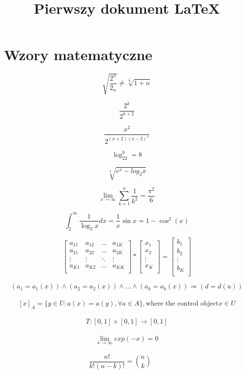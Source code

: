 \documentclass[20pt, letterpaper, titlepage]{article}
\title{Pierwszy dokument LaTeX}
\begin{document}
\section{Wzory matematyczne}
\begin{LARGE}
$$ \sqrt{ \frac{2^{n}}{2_n}} \neq \sqrt[\frac{1}{3}]{1+n} $$

$$ \frac{2^k}{2^{k+2}} $$


$$ \frac{x^2}{2^{(x+2)(x-2)^3}} $$

$$ \log_22^{8} = 8$$

$$ \sqrt[3]{e^x - log_2x} $$

$$\lim_{x \to \infty } \sum_{k=1}^{n} \frac{1}{k^2} = \frac{\pi^2}{6}$$ 

$$\int_{2}^{\infty} \frac{1}{\log_2x}dx = \frac{1}{x} \sin x = 1 - \cos^2(x)$$

$$ \left[ \begin{array}{cccc}
a_{11} & a_{12} & \ldots & a_{1K} \\
a_{21} & a_{22} & \ldots & a_{2K}\\
\vdots & \vdots & \ddots & \vdots \\
a_{K1} & a_{K2} & \ldots & a_{KK}\\
\end{array} \right]*
\left[ \begin{array}{c}
x_{1} \\
x_{2} \\
\vdots \\
x_{K} \\
\end{array} \right]=
\left[ \begin{array}{c}
b_{1} \\
b_{2} \\
\vdots \\
b_{K} \\
\end{array} \right]$$

$$
(a_1 = a_1(x)) \wedge (a_2 = a_2(x)) \wedge \ldots \wedge (a_k = a_k(x)) \Rightarrow (d = d(u))
$$\\

$$
[x]_A = \{y \in U : a(x) = a(y),\forall a \in A\}, \text{where the control object} x \in U
$$\\

$$
T : [0,1] \times [0,1] \longrightarrow [0,1]
$$\\

$$
\lim_{x \to \infty} exp(-x) = 0
$$\\

$$
\frac{n!}{k!(n - k)!} = {n \choose k}\qquad
$$\\


\end{LARGE}
\end{document}
